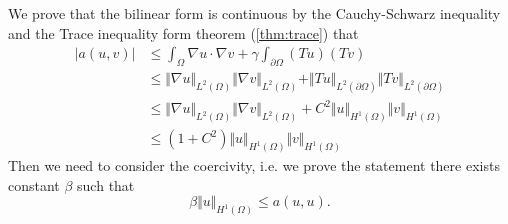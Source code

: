 \documentclass[11pt,letterpaper]{article}
\begin{document}
We prove that the bilinear form is continuous by the Cauchy-Schwarz inequality and the Trace inequality
form theorem (\ref{thm:trace}) that 
\begin{displaymath}
  \begin{aligned}
    |a(u,v)|&\leq \int_\Omega  \nabla u\cdot \nabla v+\gamma\int_{\partial \Omega} (Tu)(Tv)\\
            &\leq \Vert \nabla u\Vert_{L^2(\Omega)} \Vert \nabla v\Vert_{L^2(\Omega)}
              + \Vert Tu\Vert_{L^2(\partial\Omega)}\Vert Tv\Vert_{L^2(\partial\Omega)}\\
    &\leq \Vert \nabla u\Vert_{L^2(\Omega)} \Vert \nabla v\Vert_{L^2(\Omega)}
      + C^2\Vert u\Vert_{H^1(\Omega)}\Vert v\Vert_{H^1(\Omega)}\\
    & \leq(1+C^2) \Vert u\Vert_{H^1(\Omega)}\Vert v\Vert_{H^1(\Omega)}
  \end{aligned}
\end{displaymath}
Then we need to consider the coercivity, i.e.
we prove the statement there exists constant $\beta$ such that 
\begin{displaymath}
  \beta\Vert u\Vert_{H^1(\Omega)}\leq a(u,u).
\end{displaymath}
\end{document}
